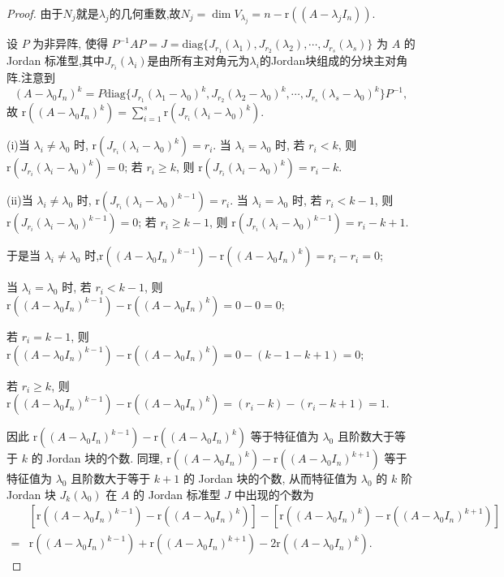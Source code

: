 \documentclass[../../main.tex]{subfiles}
\begin{document}
\begin{proof}
由于$N_j$就是$\lambda_j$的几何重数,故$N_j=\dim V_{\lambda_j}=n-\mathrm{r}((A - \lambda_j I_n))$.

设 $P$ 为非异阵, 使得 $P^{-1}AP = J = \mathrm{diag}\{J_{r_1}(\lambda_1),J_{r_2}(\lambda_2),\cdots,J_{r_s}(\lambda_s)\}$ 为 $A$ 的 Jordan 标准型,其中$J_{r_i}(\lambda_i)$是由所有主对角元为$\lambda_i$的Jordan块组成的分块主对角阵.注意到
\[
(A - \lambda_0 I_n)^k = P\mathrm{diag}\{J_{r_1}(\lambda_1 - \lambda_0)^k,J_{r_2}(\lambda_2 - \lambda_0)^k,\cdots,J_{r_s}(\lambda_s - \lambda_0)^k\}P^{-1},
\]
故 $\mathrm{r}((A - \lambda_0 I_n)^k) = \sum_{i = 1}^{s}\mathrm{r}(J_{r_i}(\lambda_i - \lambda_0)^k)$.

(i)当 $\lambda_i \neq \lambda_0$ 时, $\mathrm{r}(J_{r_i}(\lambda_i - \lambda_0)^k) = r_i$. 
当 $\lambda_i = \lambda_0$ 时, 
若 $r_i < k$, 则 $\mathrm{r}(J_{r_i}(\lambda_i - \lambda_0)^k) = 0$; 
若 $r_i \geqslant  k$, 则 $\mathrm{r}(J_{r_i}(\lambda_i - \lambda_0)^k) = r_i - k$. 

(ii)当 $\lambda_i \neq \lambda_0$ 时, $\mathrm{r}(J_{r_i}(\lambda_i - \lambda_0)^{k-1}) = r_i$. 
当 $\lambda_i = \lambda_0$ 时, 
若 $r_i < k-1$, 则 $\mathrm{r}(J_{r_i}(\lambda_i - \lambda_0)^{k-1}) = 0$; 
若 $r_i \geqslant  k-1$, 则 $\mathrm{r}(J_{r_i}(\lambda_i - \lambda_0)^{k-1}) = r_i - k+1$. 

于是当 $\lambda_i \neq \lambda_0$ 时,$\mathrm{r}((A - \lambda_0 I_n)^{k - 1}) - \mathrm{r}((A - \lambda_0 I_n)^k)=r_i-r_i=0$;

当 $\lambda_i = \lambda_0$ 时, 
若 $r_i < k-1$, 则$\mathrm{r}((A - \lambda_0 I_n)^{k - 1}) - \mathrm{r}((A - \lambda_0 I_n)^k)=0-0=0$;

若 $r_i =k-1$, 则$\mathrm{r}((A - \lambda_0 I_n)^{k - 1}) - \mathrm{r}((A - \lambda_0 I_n)^k)=0-(k-1-k+1)=0$;

若 $r_i \geqslant  k$, 则$\mathrm{r}((A - \lambda_0 I_n)^{k - 1}) - \mathrm{r}((A - \lambda_0 I_n)^k)=(r_i-k)-(r_i-k+1)=1$.

因此 $\mathrm{r}((A - \lambda_0 I_n)^{k - 1}) - \mathrm{r}((A - \lambda_0 I_n)^k)$ 等于特征值为 $\lambda_0$ 且阶数大于等于 $k$ 的 Jordan 块的个数. 同理, $\mathrm{r}((A - \lambda_0 I_n)^k) - \mathrm{r}((A - \lambda_0 I_n)^{k + 1})$ 等于特征值为 $\lambda_0$ 且阶数大于等于 $k + 1$ 的 Jordan 块的个数, 从而特征值为 $\lambda_0$ 的 $k$ 阶 Jordan 块 $J_k(\lambda_0)$ 在 $A$ 的 Jordan 标准型 $J$ 中出现的个数为
\begin{align*}
&[\mathrm{r}((A - \lambda_0 I_n)^{k - 1}) - \mathrm{r}((A - \lambda_0 I_n)^k)] - [\mathrm{r}((A - \lambda_0 I_n)^k) - \mathrm{r}((A - \lambda_0 I_n)^{k + 1})]\\
=&\mathrm{r}((A - \lambda_0 I_n)^{k - 1}) + \mathrm{r}((A - \lambda_0 I_n)^{k + 1}) - 2\mathrm{r}((A - \lambda_0 I_n)^k). 
\end{align*}
\end{proof}
\end{document}
